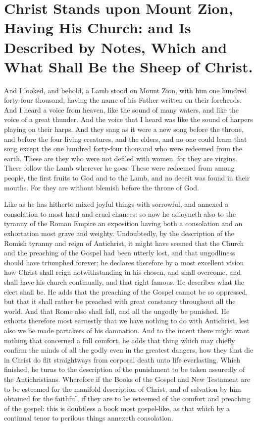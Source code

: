 \chapter[Sermon 62. Christ Stands upon Mount Zion, Having His Church: and Is Described by Notes, Which and What Shall Be the Sheep of Christ.]{Christ Stands upon Mount Zion, Having His Church: and Is Described by Notes, Which and What Shall Be the Sheep of Christ.}
\label{sermon:062}

And I looked, and behold, a Lamb stood on Mount Zion, with him one hundred forty-four thousand, having the name of his Father written on their foreheads. And I heard a voice from heaven, like the sound of many waters, and like the voice of a great thunder. And the voice that I heard was like the sound of harpers playing on their harps. And they sang as it were a new song before the throne, and before the four living creatures, and the elders, and no one could learn that song except the one hundred forty-four thousand who were redeemed from the earth. These are they who were not defiled with women, for they are virgins. These follow the Lamb wherever he goes. These were redeemed from among people, the first fruits to God and to the Lamb, and no deceit was found in their mouths. For they are without blemish before the throne of God.

Like as he has hitherto mixed joyful things with sorrowful, and annexed a consolation to most hard and cruel chances: so now he adioyneth also to the tyranny of the Roman Empire an exposition having both a consolation and an exhortation most grave and weighty. Undoubtedly, by the description of the Romish tyranny and reign of Antichrist, it might have seemed that the Church and the preaching of the Gospel had been utterly lost, and that ungodliness should have triumphed forever; he declares therefore by a most excellent vision how Christ shall reign notwithstanding in his chosen, and shall overcome, and shall have his church continually, and that right famous. He describes what the elect shall be. He adds that the preaching of the Gospel cannot be so oppressed, but that it shall rather be preached with great constancy throughout all the world. And that Rome also shall fall, and all the ungodly be punished. He exhorts therefore most earnestly that we have nothing to do with Antichrist, lest also we be made partakers of his damnation. And to the intent there might want nothing that concerned a full comfort, he adds that thing which may chiefly confirm the minds of all the godly even in the greatest dangers, how they that die in Christ do flit straightways from corporal death unto life everlasting. Which finished, he turns to the description of the punishment to be taken assuredly of the Antichristians. Wherefore if the Books of the Gospel and New Testament are to be esteemed for the manifold description of Christ, and of salvation by him obtained for the faithful, if they are to be esteemed of the comfort and preaching of the gospel: this is doubtless a book most gospel-like, as that which by a continual tenor to perilous things annexeth consolation.


